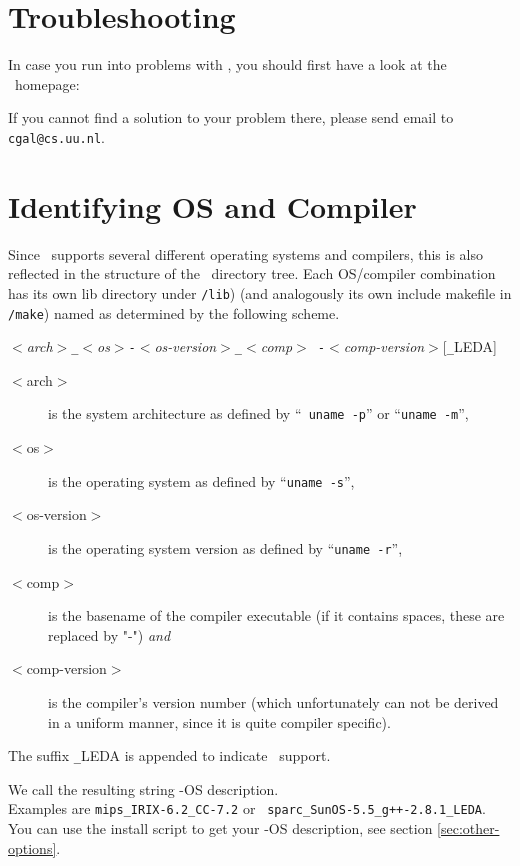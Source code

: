 \section{Troubleshooting}\label{sec:troubleshooting}

In case you run into problems with \cgal, you should first have a look
at the \cgal\ homepage:
\begin{alltt}
\cgalhomepage
\end{alltt}
If you cannot find a solution to your problem there, please send email
to \texttt{cgal@cs.uu.nl}.

\section{Identifying OS and Compiler}\label{sec:os-compiler-id}

Since \cgal\ supports several different operating systems and
compilers, this is also reflected in the structure of the \cgal\ 
directory tree. Each OS/compiler combination has its own lib directory
under \texttt{\cgaldir/lib}) (and analogously its own include makefile
in \texttt{\cgaldir/make}) named as determined by the following
scheme.
\begin{center}
  \textit{$<$arch$>$\texttt{\_}$<$os$>$\texttt{-}$<$os-version$>$\texttt{\_}$<$comp$>${\tt
    -}$<$comp-version$>$}[\texttt{\_}LEDA]
\end{center}

\begin{description}
\item[$<$arch$>$] is the system architecture as defined by ``{\tt
    uname -p}'' or ``\texttt{uname -m}'',
\item[$<$os$>$] is the operating system as defined by ``\texttt{uname
    -s}'',
\item[$<$os-version$>$] is the operating system version as defined by
  ``\texttt{uname -r}'',
\item[$<$comp$>$] is the basename of the compiler executable (if it
  contains spaces, these are replaced by "-") \textit{and}
\item[$<$comp-version$>$] is the compiler's version number (which
  unfortunately can not be derived in a uniform manner, since it is
  quite compiler specific).
\end{description}

The suffix \texttt{\_}LEDA is appended to indicate \leda\ support. 

We call the resulting string \cgal-OS description.\\ Examples are
\texttt{mips\_IRIX-6.2\_CC-7.2} or {\tt
  sparc\_SunOS-5.5\_g++-2.8.1\_LEDA}.\\ You can use the install script
to get your \cgal-OS description, see section \ref{sec:other-options}.

